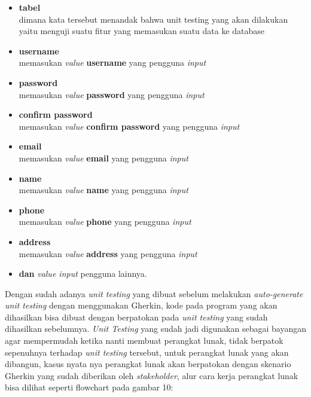 \documentclass[a4paper,twoside]{article}
\begin{document}
\begin{enumerate}
\begin{itemize}
	\item \textbf{tabel}\\ dimana kata tersebut menandak bahwa unit testing yang akan dilakukan yaitu menguji suatu fitur yang memasukan suatu data ke database
	\item \textbf{username}\\
	memasukan \textit{value} \textbf{username} yang pengguna \textit{input}
	\item \textbf{password}\\
	memasukan \textit{value} \textbf{password} yang pengguna \textit{input}
	\item \textbf{confirm password}\\
	memasukan \textit{value} \textbf{confirm password} yang pengguna \textit{input}
	\item \textbf{email}\\
	memasukan \textit{value} \textbf{email} yang pengguna \textit{input}
	\item \textbf{name}\\
	memasukan \textit{value} \textbf{name} yang pengguna \textit{input}
	\item \textbf{phone}\\
	memasukan \textit{value} \textbf{phone} yang pengguna \textit{input}
	\item \textbf{address}\\
	memasukan \textit{value} \textbf{address} yang pengguna \textit{input}
	\item \textbf{dan} \textit{value input} pengguna lainnya. 
\end{itemize}

Dengan sudah adanya \textit{unit testing} yang dibuat sebelum melakukan \textit{auto-generate unit testing} dengan menggunakan Gherkin, kode pada program yang akan dihasilkan bisa dibuat dengan berpatokan pada \textit{unit testing} yang sudah dihasilkan sebelumnya. \textit{Unit Testing} yang sudah jadi digunakan sebagai bayangan agar mempermudah ketika nanti membuat perangkat lunak, tidak  berpatok sepenuhnya terhadap \textit{unit testing} tersebut, untuk perangkat lunak yang akan dibangun, kasus nyata nya perangkat lunak akan berpatokan dengan skenario Gherkin yang sudah diberikan oleh \textit{stakeholder}, alur cara kerja perangkat lunak bisa dilihat seperti flowchart pada gambar 10:


\end{enumerate}
\end{document}
